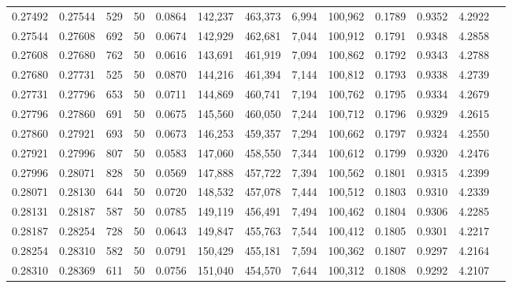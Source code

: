 \begin{tabular}{rrrrrrrrrrrrr}
0.27492 & 0.27544 &   529 &  50 &                                     0.0864 & 142,237 & 463,373 &   6,994 & 100,962 & 0.1789 & 0.9352 & 4.2922 \\
0.27544 & 0.27608 &   692 &  50 &                                     0.0674 & 142,929 & 462,681 &   7,044 & 100,912 & 0.1791 & 0.9348 & 4.2858 \\
0.27608 & 0.27680 &   762 &  50 &                                     0.0616 & 143,691 & 461,919 &   7,094 & 100,862 & 0.1792 & 0.9343 & 4.2788 \\
0.27680 & 0.27731 &   525 &  50 &                                     0.0870 & 144,216 & 461,394 &   7,144 & 100,812 & 0.1793 & 0.9338 & 4.2739 \\
0.27731 & 0.27796 &   653 &  50 &                                     0.0711 & 144,869 & 460,741 &   7,194 & 100,762 & 0.1795 & 0.9334 & 4.2679 \\
0.27796 & 0.27860 &   691 &  50 &                                     0.0675 & 145,560 & 460,050 &   7,244 & 100,712 & 0.1796 & 0.9329 & 4.2615 \\
0.27860 & 0.27921 &   693 &  50 &                                     0.0673 & 146,253 & 459,357 &   7,294 & 100,662 & 0.1797 & 0.9324 & 4.2550 \\
0.27921 & 0.27996 &   807 &  50 &                                     0.0583 & 147,060 & 458,550 &   7,344 & 100,612 & 0.1799 & 0.9320 & 4.2476 \\
0.27996 & 0.28071 &   828 &  50 &                                     0.0569 & 147,888 & 457,722 &   7,394 & 100,562 & 0.1801 & 0.9315 & 4.2399 \\
0.28071 & 0.28130 &   644 &  50 &                                     0.0720 & 148,532 & 457,078 &   7,444 & 100,512 & 0.1803 & 0.9310 & 4.2339 \\
0.28131 & 0.28187 &   587 &  50 &                                     0.0785 & 149,119 & 456,491 &   7,494 & 100,462 & 0.1804 & 0.9306 & 4.2285 \\
0.28187 & 0.28254 &   728 &  50 &                                     0.0643 & 149,847 & 455,763 &   7,544 & 100,412 & 0.1805 & 0.9301 & 4.2217 \\
0.28254 & 0.28310 &   582 &  50 &                                     0.0791 & 150,429 & 455,181 &   7,594 & 100,362 & 0.1807 & 0.9297 & 4.2164 \\
0.28310 & 0.28369 &   611 &  50 &                                     0.0756 & 151,040 & 454,570 &   7,644 & 100,312 & 0.1808 & 0.9292 & 4.2107 \\

\end{tabular}
